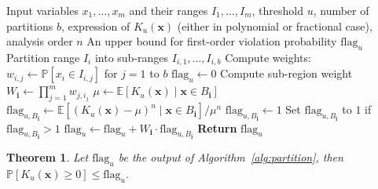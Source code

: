 \documentclass[10pt,a4paper]{amsart}
\newtheorem{theorem}{Theorem}
\newcommand{\flag}{\mathrm{flag}}
\begin{document}
\begin{algorithm}[ht]
\caption{Computing $\flag_u$ with range partition}
\label{alg:partition}
\begin{algorithmic}[1]
\Require Input variables $x_1, \dots, x_m$ and their ranges $I_1, \dots, I_m$, threshold $u$, number of partitions $b$, expression of $K_u(\mathbf x)$ {(either in polynomial or fractional case)}, analysis order $n$
\Ensure An upper bound for first-order violation probability $\flag_u$
    \State Partition range $I_i$ into sub-ranges $I_{i, 1},\dots,I_{i, b}$
    \State Compute weights: $w_{i,j} \gets \mathbb P[x_i\in I_{i,j}]$ for $j = 1$ to $b$
\EndFor
\State $\flag_u \gets 0$
    \State Compute sub-region weight $W_{\mathbf i} \gets \prod_{j=1}^mw_{j, i_j}$ 
    \State $\mu \gets \mathbb E[K_u(\mathbf x)\mid \mathbf x\in B_{\mathbf i}]$ 
        \State $\flag_{u, B_{\mathbf i}} \gets \mathbb E[(K_u(\mathbf x) - \mu)^n \mid \mathbf x \in B_{\mathbf i}]/\mu^n$
    \Else 
        \State $\flag_{u, B_{\mathbf i}} \gets 1$
    \EndIf 
    \State Set $\flag_{u, B_{\mathbf i}}$ to $1$ if $\flag_{u, B_{\mathbf i}} > 1$
    \State $\flag_u \gets \flag_u + W_{\mathbf i} \cdot \flag_{u, B_{\mathbf i}}$
\EndFor
\State \textbf{Return} $\flag_u$
\end{algorithmic}
\end{algorithm} 

\begin{theorem}
Let $\flag_u$ be the output of Algorithm~\ref{alg:partition}, then $\mathbb P[K_u(\mathbf x) \ge 0] \le \flag _u$.
\label{thm:partitioncorrect}
\end{theorem}
\end{document}
